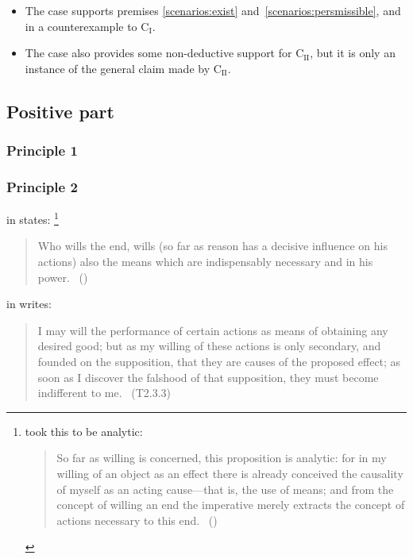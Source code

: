 \documentclass[10pt]{article}
\newcommand{\hozlinedash}[0]{%
  \noindent\hdashrule[0.5ex][c]{\textwidth}{.1pt}{2.5pt}
}
\begin{document}
\begin{itemize}
\item The case supports premises \ref{scenarios:exist} and~\ref{scenarios:persmissible}, and in a counterexample to C\(_{\text{I}}\).

\item The case also provides some non-deductive support for C\(_{\text{II}}\), but it is only an instance of the general claim made by C\(_{\text{II}}\).
\end{itemize}


\newpage

\subsection{Positive part}
\label{sec:positive-part}


\subsubsection{Principle 1}
\label{sec:principle-1}


\subsubsection{Principle 2}
\label{sec:principle-2}


\citeauthor{Kant:1948aa} in  states:\nolinebreak
\footnote{\citeauthor{Kant:1948aa} took this to be analytic:
  \begin{quote}
    So far as willing is concerned, this proposition is analytic: for in my willing of an object as an effect there is already conceived the causality of myself as an acting cause---that is, the use of means; and from the concept of willing an end the imperative merely extracts the concept of actions necessary to this end.\nolinebreak
    \mbox{ }\hfill(\citeyear[81]{Kant:1948aa})
  \end{quote}
}

\begin{quote}
  Who wills the end, wills (so far as reason has a decisive influence on his actions) also the means which are indispensably necessary and in his power.\nolinebreak
  \mbox{ }\hfill\mbox{(\citeyear[80--81/Ak 417]{Kant:1948aa})}
\end{quote}

\hozlinedash

\citeauthor{Hume:2011aa} in  writes:

\begin{quote}
  I may will the performance of certain actions as means of obtaining any desired good; but as my willing of these actions is only secondary, and founded on the supposition, that they are causes of the proposed effect; as soon as I discover the falshood of that supposition, they must become indifferent to me.\nolinebreak
  \mbox{ }\hfill\mbox{\hfill(T2.3.3)}
\end{quote}
\end{document}
